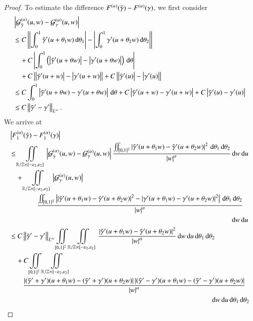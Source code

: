 \begin{proof}
\renewcommand{\gt}{\tilde\gamma}%
 To estimate the difference $F^{(\alpha)}(\gt)-F^{(\alpha)}(\g)$, we first consider
 \begin{align*}
  &\abs{\G[\gt](u,w)-\G(u,w)} \\
  &\le C\abs{\abs{\int_0^1\dtg(u+\theta_1w)\d\theta_1}-\abs{\int_0^1\dg(u+\theta_2w)\d\theta_2}}
  \\
  & \quad{}+C\abs{\int_0^1\br{\abs{\dgt(u+\theta w)}-\abs{\dg(u+\theta w)}}\d\theta} \\
  &\quad{}+C\abs{\abs{\dgt(u+w)}-\abs{\dg(u+w)}} +C\abs{\abs{\dgt(u)}-\abs{\dg(u)}} \\
  &\le C\int_0^1\abs{\dgt(u+\theta w)-\dg(u+\theta w)}\d\theta +C\abs{{\dgt(u+w)}-{\dg(u+w)}} +C\abs{{\dgt(u)}-{\dg(u)}} \\
  &\le C\norm{\dgt-\dg}_{L^\infty}.
 \end{align*}
 We arrive at
 \begin{align*}
  &\abs{F_1^{(\alpha)}(\gt)-F^{(\alpha)}_1(\g)} \\
  &\le \iint\limits_{\R/\Z\times[-\eps_2,\eps_2]}\abs{\G[\gt](u,w)-\G(u,w)}\frac{\iint_{[0,1]^2}\abs{\dgt(u+\theta_1w)-\dgt(u+\theta_2w)}^2\d\theta_1\d\theta_2}{\abs w^\alpha}\d w\d u \\
  &\quad{}+\iint\limits_{\R/\Z\times[-\eps_2,\eps_2]}\abs{\G[\g](u,w)}\\
  & \qquad \qquad  \frac{\iint_{[0,1]^2}\abs{\abs{\dgt(u+\theta_1w)-\dgt(u+\theta_2w)}^2-\abs{\dg(u+\theta_1w)-\dg(u+\theta_2w)}^2}\d\theta_1\d\theta_2}{\abs w^\alpha} \\
  & \hspace{11.2cm}\d w\d u \\
  &\le C\norm{\dgt-\dg}_{L^\infty}\iint\limits_{[0,1]^2}\iint\limits_{\R/\Z\times[-\eps_2,\eps_2]}\frac{\abs{\dgt(u+\theta_1w)-\dgt(u+\theta_2w)}^2}{\abs w^\alpha}\d w\d u\d\theta_1\d\theta_2 \\
  &\quad{}+C\iint\limits_{[0,1]^2}\iint\limits_{\R/\Z\times[-\eps_2,\eps_2]} \\
  & \qquad  \frac{\abs{(\dgt+\dg)(u+\theta_1w)-(\dgt+\dg)(u+\theta_2w)}\abs{(\dgt-\dg)(u+\theta_1w)-(\dgt-\dg)(u+\theta_2w)}}{\abs w^\alpha} \\
  & \hspace{10.2cm}\d w\d u\d\theta_1\d\theta_2 \\

\end{align*}
\end{proof}

